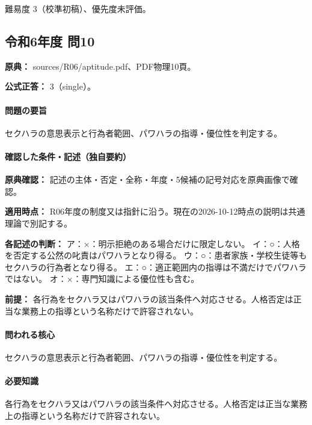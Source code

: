\par 難易度 3（校準初稿）、優先度未評価。

\subsection{令和6年度 問10}
\label{q:r06-reg-apt-10}

\noindent\textbf{原典：} sources/R06/aptitude.pdf、PDF物理10頁。

\textbf{公式正答：} 3（single）。

\paragraph{問題の要旨} セクハラの意思表示と行為者範囲、パワハラの指導・優位性を判定する。

\paragraph{確認した条件・記述（独自要約）}\mbox{}\par

\noindent\textbf{原典確認：} 記述の主体・否定・全称・年度・5候補の記号対応を原典画像で確認。\par

\noindent\textbf{適用時点：} R06年度の制度又は指針に沿う。現在の2026-10-12時点の説明は共通理論で別記する。\par

\noindent\textbf{各記述の判断：} ア：×：明示拒絶のある場合だけに限定しない。 イ：○：人格を否定する公然の叱責はパワハラとなり得る。 ウ：○：患者家族・学校生徒等もセクハラの行為者となり得る。 エ：○：適正範囲内の指導は不満だけでパワハラではない。 オ：×：専門知識による優位性も含む。\par

\noindent\textbf{前提：} 各行為をセクハラ又はパワハラの該当条件へ対応させる。人格否定は正当な業務上の指導という名称だけで許容されない。\par

\paragraph{問われる核心} セクハラの意思表示と行為者範囲、パワハラの指導・優位性を判定する。

\paragraph{必要知識} 各行為をセクハラ又はパワハラの該当条件へ対応させる。人格否定は正当な業務上の指導という名称だけで許容されない。

